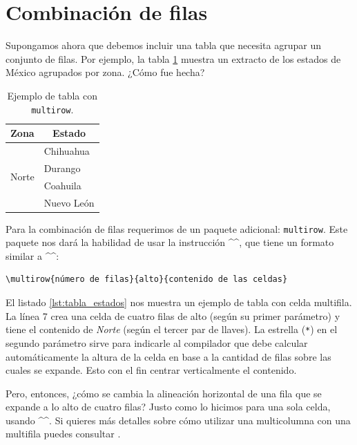 \section{Combinación de filas	}
\label{sec:combinacion_de_filas}


Supongamos ahora que debemos incluir una tabla que necesita agrupar un conjunto de filas. Por ejemplo, la tabla \ref{tab:estados_norte} muestra un extracto de los estados de México agrupados por zona. ¿Cómo fue hecha?

\begin{table}[ht]
\centering
\begin{tabular}{ll}
\hline
\multicolumn{1}{c}{\textbf{Zona}} & \multicolumn{1}{c}{\textbf{Estado}}
\\ \hline
\multirow{4}{*}{Norte}            & Chihuahua                           \\
                                  & Durango                             \\
                                  & Coahuila                            \\
                                  & Nuevo León                          \\ \hline
\end{tabular}
\caption{Ejemplo de tabla con \texttt{multirow}.}
\label{tab:estados_norte}
\end{table}

Para la combinación de filas requerimos de un paquete adicional: \texttt{multirow}. Este paquete nos dará la habilidad de usar la instrucción ^\multirow^, que tiene un formato similar a ^\multicolumn^:

\begin{lstlisting}[style=latex,numbers=none]
\multirow{número de filas}{alto}{contenido de las celdas}
\end{lstlisting}

El listado \ref{lst:tabla_estados} nos muestra un ejemplo de tabla con celda multifila. La línea 7 crea una celda de cuatro filas de alto (según su primer parámetro) y tiene el contenido de \emph{Norte} (según el tercer par de llaves). La estrella (\texttt{*}) en el segundo parámetro sirve para indicarle al compilador que debe calcular automáticamente la altura de la celda en base a la cantidad de filas sobre las cuales se expande. Esto con el fin centrar verticalmente el contenido.

Pero, entonces, ¿cómo se cambia la alineación horizontal de una fila que se expande a lo alto de cuatro filas? Justo como lo hicimos para una sola celda, usando ^\multicolumn^. Si quieres más detalles sobre cómo utilizar una multicolumna con una multifila puedes consultar \cite{bib:multicol_multirow}.

